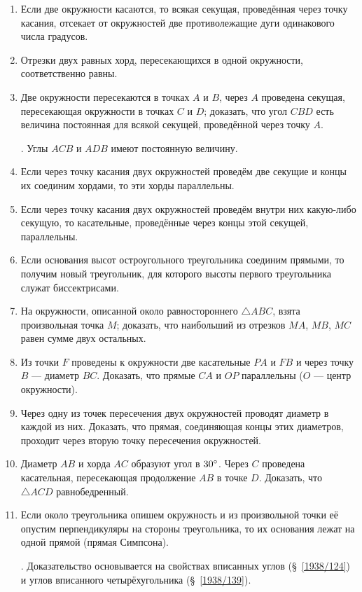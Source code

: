 \documentclass[oneside]{book}
\begin{document}
\begin{enumerate}[resume]

 \item
Если две окружности касаются, то всякая секущая, проведённая через точку касания, отсекает от окружностей две противолежащие дуги одинакового числа градусов.

 \item
Отрезки двух равных хорд, пересекающихся в одной окружности, соответственно равны.

 \item
Две окружности пересекаются в точках $A$ и $B$, через $A$ проведена секущая, пересекающая окружности в точках $C$ и $D$;
доказать, что угол $CBD$ есть величина постоянная для всякой секущей, проведённой через точку $A$.

.
Углы $ACB$ и $ADB$ имеют постоянную величину.

 \item
Если через точку касания двух окружностей проведём две секущие и концы их соединим хордами, то эти хорды параллельны.

 \item
Если через точку касания двух окружностей проведём внутри них какую-либо секущую, то касательные, проведённые через концы этой секущей, параллельны.

 \item
Если основания высот остроугольного треугольника соединим прямыми, то получим новый треугольник, для которого высоты первого треугольника служат биссектрисами. 

 \item
На окружности, описанной около равностороннего $\triangle ABC$, взята произвольная точка $M$;
доказать, что наибольший из отрезков $MA$, $MB$, $MC$ равен сумме двух остальных.

 \item
Из точки $F$ проведены к окружности две касательные $PA$ и $FB$ и через точку $B$ — диаметр $BC$.
Доказать, что прямые $CA$ и $OP$ параллельны ($O$ — центр окружности).

 \item
Через одну из точек пересечения двух окружностей проводят диаметр в каждой из них.
Доказать, что прямая, соединяющая концы этих диаметров, проходит через вторую точку пересечения окружностей.

 \item
Диаметр $AB$ и хорда $AC$ образуют угол в $30\degree$.
Через $C$ проведена касательная, пересекающая продолжение $AB$ в точке $D$.
Доказать, что $\triangle ACD$ равнобедренный.

 \item
Если около треугольника опишем окружность и из произвольной точки её опустим перпендикуляры на стороны треугольника, то их основания лежат на одной прямой (прямая Симпсона).

.
Доказательство основывается на свойствах вписанных углов (§~\ref{1938/124}) и углов вписанного четырёхугольника (§~\ref{1938/139}).


\end{enumerate}
\end{document}
